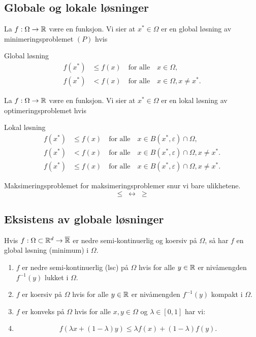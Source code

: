 \documentclass[11pt, a4paper]{article}
\begin{document}
\subsection{Globale og lokale løsninger}

La $f: \Omega \to \mathbb{R}$ være en funksjon. Vi sier at $x^* \in \Omega$ er en global løsning av minimeringsproblemet \((P)\) hvis

\begin{definition}{Global løsning}{}
  \begin{align*}
    f(x^*) & \leq f(x) \quad \text{for alle} \quad x \in \Omega, \tag{Global løsning}                 \\
    f(x^*) & < f(x) \quad \text{for alle} \quad x \in \Omega, x \neq x^*. \tag{Streng global løsning}
  \end{align*}
\end{definition}

La $f: \Omega \to \mathbb{R}$ være en funksjon. Vi sier at $x^* \in \Omega$ er en lokal løsning av optimeringsproblemet hvis

\begin{definition}{Lokal løsning}{}
  \begin{align*}
    f(x^*) & \leq f(x) \quad \text{for alle} \quad x \in B(x^*, \varepsilon) \cap \Omega, \tag{Lokal løsning}                     \\
    f(x^*) & < f(x) \quad \text{for alle} \quad x \in B(x^*, \varepsilon) \cap \Omega, x \neq x^*. \tag{Streng lokal løsning}     \\
    f(x^*) & \leq f(x) \quad \text{for alle} \quad x \in B(x^*, \varepsilon) \cap \Omega, x \neq x^*. \tag{Isolert lokal løsning}
  \end{align*}
\end{definition}

\begin{remark}{Maksimeringsproblemet}{}
  for maksimeringsproblemer snur vi bare ulikhetene.
  \[
    \leq \; \leftrightarrow \; \geq
  \]
\end{remark}

\subsection*{Eksistens av globale løsninger}

Hvis $f: \Omega \subset \mathbb{R}^d \to \overline{\mathbb{R}}$ er nedre semi-kontinuerlig og koersiv på $\Omega$, så har $f$ en global løsning (minimum) i $\Omega$.

\begin{enumerate}
  \item $f$ er nedre semi-kontinuerlig (lsc) på $\Omega$ hvis for alle $y \in \mathbb{R}$ er nivåmengden $f^{-1}(y)$ lukket i $\Omega$.
  \item $f$ er koersiv på $\Omega$ hvis for alle $y \in \mathbb{R}$ er nivåmengden $f^{-1}(y)$ kompakt i $\Omega$.
  \item $f$ er konveks på $\Omega$ hvis for alle $x, y \in \Omega$ og $\lambda \in [0, 1]$ har vi:
  \item
        \[
          f(\lambda x + (1 - \lambda)y) \leq \lambda f(x) + (1 - \lambda)f(y).
        \]
\end{enumerate}
\end{document}

